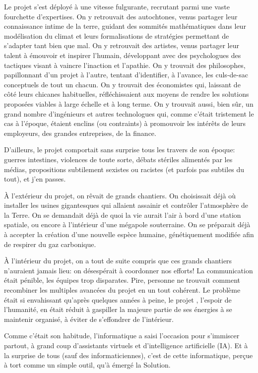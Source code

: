Le projet \nomProjet{} s'est déployé à une vi\-tesse
fulgurante, recrutant parmi une vaste fourchette d'expertises.  On y
retrouvait des autochtones, venus partager leur connaissance intime de la
terre, guidant des sommités mathé\-matiques dans leur modélisation du climat et
leurs formalisations de stra\-tégies permettant de s'adapter tant
bien que mal.  On y retrouvait des artistes, venus partager leur talent à
émouvoir et inspirer l'humain, développant avec des psychologues des
tactiques visant à vaincre l'in\-act\-ion et l'apathie.  On y trouvait des
philosophes, papillonnant d'un projet à l'autre, tentant d'identifier, à
l'avance, les culs-de-sac con\-cept\-uels de tout un chacun.  On y trouvait
des économistes qui, laissant de côté leurs chicanes habituelles,
réfléchissaient aux moyens de rendre les solutions proposées viables à
large échelle et à long terme.  On y trouvait aussi, bien sûr, un grand
nombre d'ingénieurs et autres technologues qui, comme c'était trist\-ement
le cas à l'époque, étaient enclins (ou contraints) à promouvoir les
intérêts de leurs employeurs, des grandes entreprises, de la finance.

D'ailleurs, le projet \nomProjet{} comportait sans surprise tous les
travers de son époque: guerres intestines, violences de toute sorte, débats
stériles alimentés par les médias, propositions
subti\-le\-ment sexistes ou racistes (et parfois pas subtiles du tout), et
j'en passes.

À l'extérieur du projet, on rêvait de grands chantiers.  On choisissait
déjà où installer les usines gigantesques qui allaient assainir et
contrô\-ler l'at\-mosphère de la Terre. On se demandait déjà de quoi la vie
aurait l'air à bord d'une station spatiale, ou encore à l'intérieur d'une
mégapole souterraine. On se préparait déjà à accepter la création d'une
nouvelle espèce humaine, génétiquement modifiée afin de respirer du gaz
carbo\-nique.

À l'intérieur du projet, on a tout de suite compris que ces grands chantiers
n'auraient jamais lieu: on désespérait à coordonner nos efforts! La
communication était pénible, les équipes trop disparates. Pire, personne ne
trouvait comment recombiner les multiples avancées du projet en un tout
cohérent.  Le problème était si envahissant qu'après quelques années à peine,
le projet \nomProjet{}, l'espoir de l'humanité, en était réduit à gaspiller la
majeure partie de ses énergies à se maintenir organisé, à éviter de s'effondrer
de l'intérieur.  

Comme c'était son habitude, l'informatique a saisi l'occasion
pour s'immiscer partout, à grand coup d'assistants virtuels et d'intelligence
artificielle (IA).  Et à la surprise de tous (sauf des informati\-ciennes),
c'est de cette informatique, perçue à tort comme un simple outil, qu'à
émergé la Solution.

